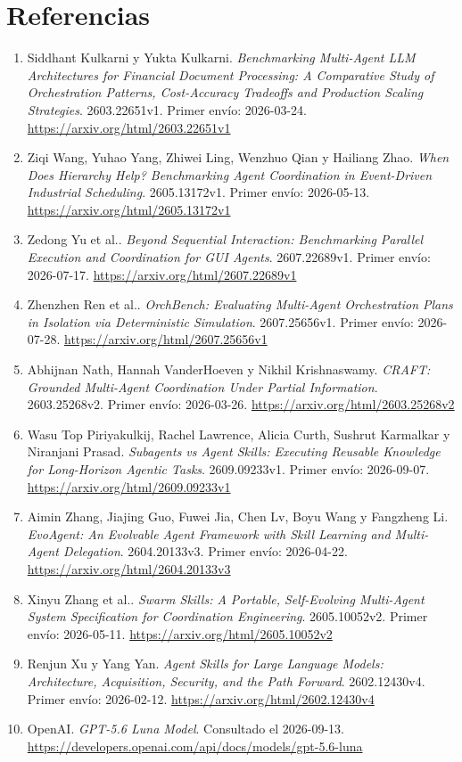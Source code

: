 \clearpage
\section*{Referencias}
\begingroup\small
\begin{enumerate}
\item Siddhant Kulkarni y Yukta Kulkarni. \textit{Benchmarking Multi-Agent LLM Architectures for Financial Document Processing: A Comparative Study of Orchestration Patterns, Cost-Accuracy Tradeoffs and Production Scaling Strategies}. 2603.22651v1. Primer envío: 2026-03-24. \url{https://arxiv.org/html/2603.22651v1}
\item Ziqi Wang, Yuhao Yang, Zhiwei Ling, Wenzhuo Qian y Hailiang Zhao. \textit{When Does Hierarchy Help? Benchmarking Agent Coordination in Event-Driven Industrial Scheduling}. 2605.13172v1. Primer envío: 2026-05-13. \url{https://arxiv.org/html/2605.13172v1}
\item Zedong Yu et al.. \textit{Beyond Sequential Interaction: Benchmarking Parallel Execution and Coordination for GUI Agents}. 2607.22689v1. Primer envío: 2026-07-17. \url{https://arxiv.org/html/2607.22689v1}
\item Zhenzhen Ren et al.. \textit{OrchBench: Evaluating Multi-Agent Orchestration Plans in Isolation via Deterministic Simulation}. 2607.25656v1. Primer envío: 2026-07-28. \url{https://arxiv.org/html/2607.25656v1}
\item Abhijnan Nath, Hannah VanderHoeven y Nikhil Krishnaswamy. \textit{CRAFT: Grounded Multi-Agent Coordination Under Partial Information}. 2603.25268v2. Primer envío: 2026-03-26. \url{https://arxiv.org/html/2603.25268v2}
\item Wasu Top Piriyakulkij, Rachel Lawrence, Alicia Curth, Sushrut Karmalkar y Niranjani Prasad. \textit{Subagents vs Agent Skills: Executing Reusable Knowledge for Long-Horizon Agentic Tasks}. 2609.09233v1. Primer envío: 2026-09-07. \url{https://arxiv.org/html/2609.09233v1}
\item Aimin Zhang, Jiajing Guo, Fuwei Jia, Chen Lv, Boyu Wang y Fangzheng Li. \textit{EvoAgent: An Evolvable Agent Framework with Skill Learning and Multi-Agent Delegation}. 2604.20133v3. Primer envío: 2026-04-22. \url{https://arxiv.org/html/2604.20133v3}
\item Xinyu Zhang et al.. \textit{Swarm Skills: A Portable, Self-Evolving Multi-Agent System Specification for Coordination Engineering}. 2605.10052v2. Primer envío: 2026-05-11. \url{https://arxiv.org/html/2605.10052v2}
\item Renjun Xu y Yang Yan. \textit{Agent Skills for Large Language Models: Architecture, Acquisition, Security, and the Path Forward}. 2602.12430v4. Primer envío: 2026-02-12. \url{https://arxiv.org/html/2602.12430v4}
\item OpenAI. \textit{GPT-5.6 Luna Model}. Consultado el 2026-09-13. \url{https://developers.openai.com/api/docs/models/gpt-5.6-luna}
\end{enumerate}
\endgroup
